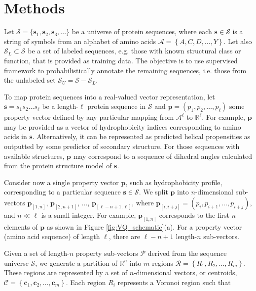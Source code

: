 

\section{Methods}

Let $\mathcal{S}=\{\mathbf{s}_{1},\mathbf{s}_{2},\mathbf{s}_{3},...\}$ be a universe of protein sequences, where each $\mathbf{s}\in\mathcal{S}$ is a string of symbols from an alphabet of amino acids $\mathcal{A}=\left\{ A,C,D,\ldots,Y\right\} $. Let also $\mathcal{S}_{L}\subset\mathcal{S}$ be a set of labeled sequences, e.g. those with known structural class or function, that is provided as training data. The objective is to use supervised framework to probabilistically annotate the remaining sequences, i.e. those from the unlabeled set $\mathcal{S}_{U}=\mathcal{S}-\mathcal{S}_{L}$. 

To map protein sequences into a real-valued vector representation, let $\mathbf{s}=s_{1}s_{2}\ldots s_{\ell}$ be a length-$\ell$ protein sequence in $\mathcal{S}$ and $\mathbf{p}=(p_{1},p_{2},\ldots,p_{\ell})$ some property vector defined by any particular mapping from $\mathcal{A}^{\ell}$ to $\mathbb{R}^{\ell}$. For example, $\mathbf{p}$ may be provided as a vector of hydrophobicity indices corresponding to amino acids in $\mathbf{s}$. Alternatively, it can be represented as predicted helical propensities as outputted by some predictor of secondary structure. For those sequences with available structures, $\mathbf{p}$ may correspond to a sequence of dihedral angles calculated from the protein structure model of $\mathbf{s}$. 

Consider now a single property vector $\mathbf{p}$, such as hydrophobicity profile, corresponding to a particular sequence $\mathbf{s}\in\mathcal{S}$. We split $\mathbf{p}$ into $n$-dimensional sub-vectors $\mathbf{p}_{[1,n]}$, $\mathbf{p}_{[2,n+1]}$, $\ldots$, $\mathbf{p}_{[\ell-n+1,\ell]}$, where $\mathbf{p}_{[i,i+j]}=(p_{i},p_{i+1},...,p_{i+j})$, and $n\ll\ell$ is a small integer. For example, $\mathbf{p}_{[1,n]}$ corresponds to the first $n$ elements of $\mathbf{p}$ as shown in Figure \ref{fig:VQ_schematic}(a). For a property vector (amino acid sequence) of length $\ell$, there are $\ell-n+1$ length-$n$ sub-vectors.

Given a set of length-$n$ property sub-vectors $\mathcal{P}$ derived from the sequence universe $\mathcal{S}$, we generate a partition of $\mathbb{R}^{n}$ into $m$ regions $\mathcal{R}=\left\{ R_{1},R_{2},\ldots,R_{m}\right\} $. These regions are represented by a set of $n$-dimensional vectors, or centroids, $\mathcal{C}=\left\{ \mathbf{c}_{1},\mathbf{c}_{2},\ldots,\mathbf{c}_{m}\right\} $. Each region $R_{i}$ represents a Voronoi region such that 


